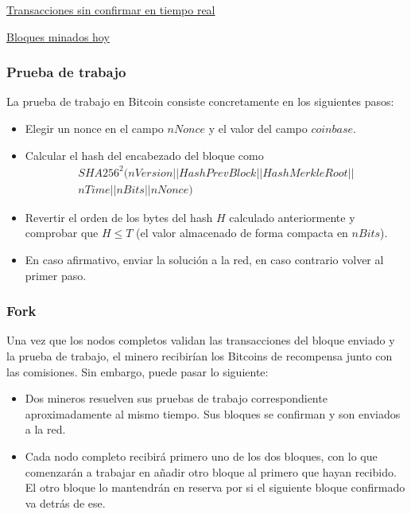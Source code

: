 \documentclass{beamer}
\theoremstyle{definition}
\begin{document}
\begin{frame}
	\href{https://www.blockchain.com/btc/unconfirmed-transactions}{Transacciones sin confirmar en tiempo real}
	
	\href{https://www.blockchain.com/btc/blocks}{Bloques minados hoy}
	
\end{frame}

\begin{frame}
	\frametitle{Prueba de trabajo}
	La prueba de trabajo en Bitcoin consiste concretamente en los siguientes pasos:
	\begin{itemize}
		\item<2-> Elegir un nonce en el campo $nNonce$ y el valor del campo $coinbase$.
		\item<3-> Calcular el hash del encabezado del bloque como
		\begin{gather*}
		SHA256^2(nVersion||HashPrevBlock||HashMerkleRoot||\\ nTime||nBits||nNonce)
		\end{gather*}
		
		\item<4-> Revertir el orden de los bytes del hash $H$ calculado anteriormente y comprobar que $H\leq T$ (el valor almacenado de forma compacta en $nBits$).
		\item<5-> En caso afirmativo, enviar la solución a la red, en caso contrario volver al primer paso.
	\end{itemize}
\end{frame}

\begin{frame}
	\frametitle{Fork}
	Una vez que los nodos completos validan las transacciones del bloque enviado y la prueba de trabajo, el minero recibirían los Bitcoins de recompensa junto con las comisiones. Sin embargo, puede pasar lo siguiente:
	
	\begin{itemize}
		\item<2-> Dos mineros resuelven sus pruebas de trabajo correspondiente aproximadamente al mismo tiempo. Sus bloques se confirman y son enviados a la red.
		\item<3-> Cada nodo completo recibirá primero uno de los dos bloques, con lo que comenzarán a trabajar en añadir otro bloque al primero que hayan recibido. El otro bloque lo mantendrán en reserva por si el siguiente bloque confirmado va detrás de ese.
	\end{itemize}
\end{frame}
\end{document}
